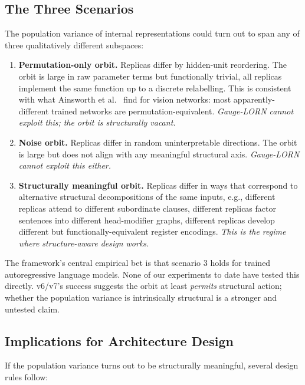 \documentclass[11pt, a4paper]{article}
\theoremstyle{plain}
\theoremstyle{definition}
\theoremstyle{remark}
\begin{document}
\subsection{The Three Scenarios}

The population variance of internal representations could turn out to span any of three qualitatively different subspaces:

\begin{enumerate}[nosep]
\item \textbf{Permutation-only orbit.} Replicas differ by hidden-unit reordering. The orbit is large in raw parameter terms but functionally trivial, all replicas implement the same function up to a discrete relabelling. This is consistent with what Ainsworth et al.~\cite{ainsworth2023git} find for vision networks: most apparently-different trained networks are permutation-equivalent. \emph{Gauge-LORN cannot exploit this; the orbit is structurally vacant.}

\item \textbf{Noise orbit.} Replicas differ in random uninterpretable directions. The orbit is large but does not align with any meaningful structural axis. \emph{Gauge-LORN cannot exploit this either.}

\item \textbf{Structurally meaningful orbit.} Replicas differ in ways that correspond to alternative structural decompositions of the same inputs, e.g., different replicas attend to different subordinate clauses, different replicas factor sentences into different head-modifier graphs, different replicas develop different but functionally-equivalent register encodings. \emph{This is the regime where structure-aware design works.}
\end{enumerate}

The framework's central empirical bet is that scenario 3 holds for trained autoregressive language models.
None of our experiments to date have tested this directly.
v6/v7's success suggests the orbit at least \emph{permits} structural action; whether the population variance is intrinsically structural is a stronger and untested claim.

\subsection{Implications for Architecture Design}

If the population variance turns out to be structurally meaningful, several design rules follow:
\end{document}
